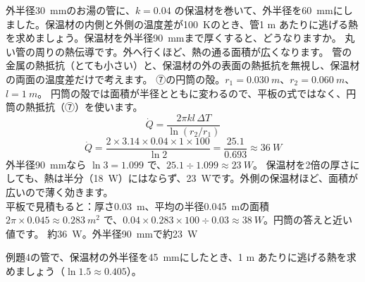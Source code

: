 \label{ph:熱-11:ex4}
\begin{phreidai}[お湯の管の保温材]
外半径\qty{30}{mm}のお湯の管に、$k=0.04$ の保温材を巻いて、外半径を\qty{60}{mm}にしました。保温材の内側と外側の温度差が\qty{100}{K}のとき、管1 m あたりに逃げる熱を求めましょう。保温材を外半径\qty{90}{mm}まで厚くすると、どうなりますか。
\phbamen
丸い管の周りの熱伝導です。外へ行くほど、熱の通る面積が広くなります。
\phmushi
管の金属の熱抵抗（とても小さい）と、保温材の外の表面の熱抵抗を無視し、保温材の両面の温度差だけで考えます。
\phzu
⑦の円筒の殻。$r_1=\qty{0.030}{m}$、$r_2=\qty{0.060}{m}$、$l=\qty{1}{m}$。
\phriyu
円筒の殻では面積が半径とともに変わるので、平板の式ではなく、円筒の熱抵抗（⑦）を使います。
\phtateru
\[\dot Q=\frac{2\pi kl\,\Delta T}{\ln(r_2/r_1)}\]
\phtoku
\[\dot Q=\frac{2\times3.14\times0.04\times1\times100}{\ln2}=\frac{25.1}{0.693}\approx\qty{36}{W}\]
外半径\qty{90}{mm}なら $\ln3=1.099$ で、$25.1\div1.099\approx\qty{23}{W}$。
\phtashikame
保温材を2倍の厚さにしても、熱は半分（\qty{18}{W}）にはならず、\qty{23}{W}です。外側の保温材ほど、面積が広いので薄く効きます。\\
平板で見積もると：厚さ\qty{0.03}{m}、平均の半径\qty{0.045}{m}の面積 $2\pi\times0.045\approx\qty{0.283}{m^2}$ で、$0.04\times0.283\times100\div0.03\approx\qty{38}{W}$。円筒の答えと近い値です。
\kotae 約\qty{36}{W}。外半径\qty{90}{mm}で約\qty{23}{W}
\end{phreidai}
\begin{jibun}
例題4の管で、保温材の外半径を\qty{45}{mm}にしたとき、1 m あたりに逃げる熱を求めましょう（$\ln1.5\approx0.405$）。
\end{jibun}

